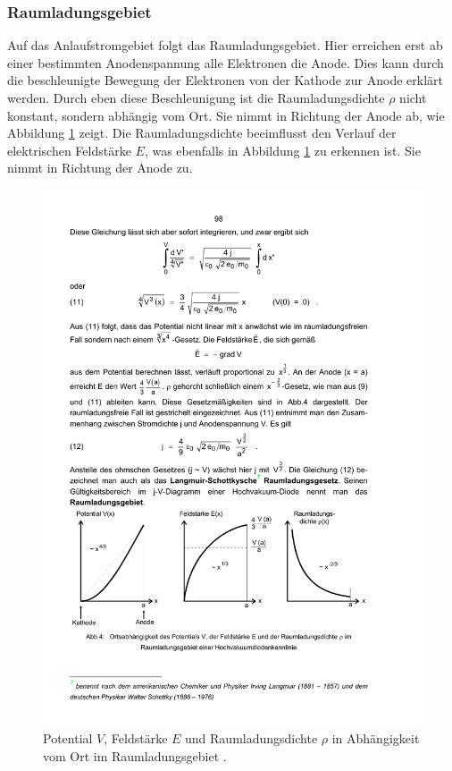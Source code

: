 \subsubsection{Raumladungsgebiet}
Auf das Anlaufstromgebiet folgt das Raumladungsgebiet. Hier erreichen erst ab einer bestimmten Anodenspannung alle Elektronen die Anode. Dies kann durch die beschleunigte Bewegung der Elektronen von der Kathode zur Anode erklärt werden. Durch eben diese Beschleunigung ist die Raumladungsdichte $\rho$ nicht konstant, sondern abhängig vom Ort. Sie nimmt in Richtung der Anode ab, wie Abbildung \ref{fig:raumladung} zeigt. Die Raumladungsdichte beeimflusst den Verlauf der elektrischen Feldstärke $E$, was ebenfalls in Abbildung \ref{fig:raumladung} zu erkennen ist. Sie nimmt in Richtung der Anode zu.

\begin{figure}
  \centering
  \includegraphics[scale=0.6]{content/raumladungsgebiet.pdf}
\caption{ Potential $V$, Feldstärke $E$  und Raumladungsdichte $\rho$ in Abhängigkeit vom Ort im Raumladungsgebiet \cite{anleitung504}.}
  \label{fig:raumladung}
\end{figure}

